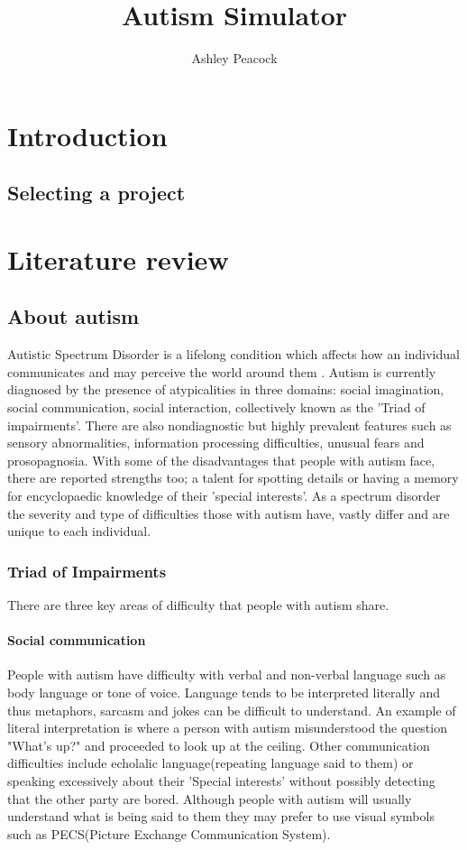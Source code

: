 \documentclass[11pt]{report}
\begin{document}
\title{Autism Simulator}
\author{Ashley Peacock}
\maketitle
\tableofcontents
\chapter{Introduction}

\section{Selecting a project}


\chapter{Literature review}
\section{About autism}

Autistic Spectrum Disorder is a lifelong condition which affects how an individual communicates and may perceive the world around them \cite{nas}. Autism is currently diagnosed by the presence of atypicalities in three domains: social imagination, social communication, social interaction, collectively known as the 'Triad of impairments'. There are also nondiagnostic but highly prevalent features such as sensory abnormalities, information processing difficulties, unusual fears and prosopagnosia. With some of the disadvantages that people with autism face, there are reported strengths too; a talent for spotting details\cite{bayes} or having a memory for encyclopaedic knowledge of their 'special interests'. As a spectrum disorder the severity and type of difficulties those with autism have, vastly differ and are unique to each individual.


\subsection{Triad of Impairments}

There are three key areas of difficulty that people with autism share.

\subsubsection*{Social communication}
People with autism have difficulty with verbal and non-verbal language such as body language or tone of voice. Language tends to be interpreted literally and thus metaphors, sarcasm and jokes can be difficult to understand\cite{nas}. An example of literal interpretation is where a person with autism misunderstood the question "What's up?" and proceeded to look up at the ceiling. Other communication difficulties include echolalic language(repeating language said to them) or speaking excessively about their 'Special interests' without possibly detecting that the other party are bored\cite{nas}. Although people with autism will usually understand what is being said to them they may prefer to use visual symbols such as PECS(Picture Exchange Communication System). 
\end{document}
